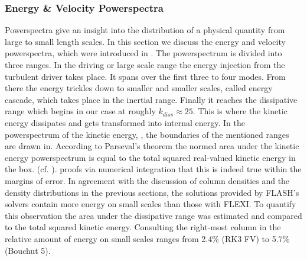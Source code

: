 


\subsubsection{Energy \& Velocity Powerspectra}
\label{sec:stirturb-pws}
Powerspectra give an insight into the distribution of a physical quantity from
large to small length scales. In this section we discuss the energy and
velocity powerspectra, which were introduced in . The
powerspectrum is divided into three ranges. In the driving or large scale range
the energy injection from the turbulent driver takes place. It spans over the
first three to four modes.  From there the energy trickles down to smaller and
smaller scales, called energy cascade, which takes place in the inertial range.
Finally it reaches the dissipative range which begins in our case at roughly
$k_{diss} \approx 25$.  This is where the kinetic energy dissipates and gets
transformed into internal energy.  In the powerspectrum of the kinetic energy,
, the boundaries of the
mentioned ranges are drawn in. According to Parseval's theorem the normed area
under the kinetic energy powerspectrum is equal to the total squared
real-valued kinetic energy in the box. (cf. ).
 proofs via numerical integration that this is indeed true
within the margins of error.  In agreement with the discussion of column
densities and the density distributions in the previous sections, the solutions
provided by FLASH's solvers contain more energy on small scales than those with
FLEXI. To quantify this observation the area under the dissipative range was
estimated and compared to the total squared kinetic energy.  Consulting the
right-most column in  the relative amount of energy on small
scales ranges from 2.4\% (RK3 FV) to 5.7\% (Bouchut 5).

